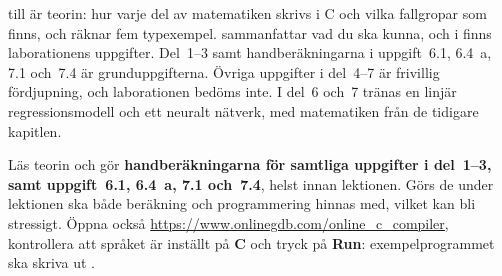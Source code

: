  till  är teorin: hur varje del av matematiken
skrivs i C och vilka fallgropar som finns, och  räknar fem typexempel.
 sammanfattar vad du ska kunna, och i 
finns laborationens uppgifter. Del~1--3 samt handberäkningarna i uppgift~6.1, 6.4~a,
7.1 och~7.4 är grunduppgifterna. Övriga uppgifter i del~4--7 är frivillig fördjupning, och
laborationen bedöms inte. I del~6
och~7 tränas en linjär regressionsmodell och ett neuralt nätverk, med matematiken från de tidigare
kapitlen.

\begin{aside}
\note[Förberedelser] Läs teorin och gör \textbf{handberäkningarna för samtliga uppgifter i
del~1--3, samt uppgift~6.1, 6.4~a, 7.1 och~7.4}, helst innan lektionen. Görs de under lektionen
ska både beräkning och programmering hinnas med, vilket kan bli stressigt. Öppna också
\url{https://www.onlinegdb.com/online_c_compiler}, kontrollera att språket är inställt på
\textbf{C} och tryck på \textbf{Run}: exempelprogrammet ska skriva ut .
\end{aside}




